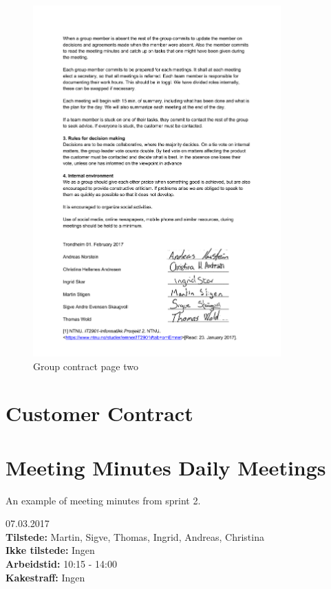 \begin{figure}[H]
\centering
    \includegraphics[width=0.85\textwidth]{fig/GroupContract2.pdf}
    \caption{Group contract page two}
    \label{Group_Contract_2}
\end{figure}

\section{Customer Contract}
\label{customer_contract}

\section{Meeting Minutes Daily Meetings}
\label{meeting_minutes_daily_meetings}

An example of meeting minutes from sprint 2. 

{\huge{07.03.2017}}\\
\textbf{Tilstede:} Martin, Sigve, Thomas, Ingrid, Andreas, Christina\\
\textbf{Ikke tilstede:} Ingen\\
\textbf{Arbeidstid:} 10:15 - 14:00\\
\textbf{Kakestraff:} Ingen \\

